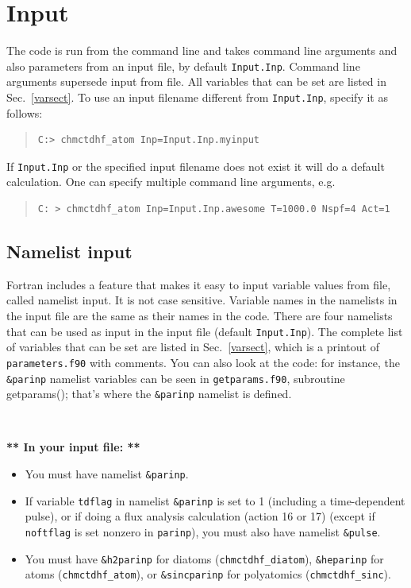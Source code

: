 \documentclass[10pt,leqno, oneside]{book}
\begin{document}
\chapter{Input}

 The code is run from the command line and takes command line arguments and also parameters from an input file, by default \verb#Input.Inp#.  
 Command line arguments supersede input from file.
 All variables that can be set are listed in Sec.~\ref{varsect}.
To use an input filename different from \verb#Input.Inp#, specify it as follows:
\begin{quote}
{\small\begin{verbatim}
C:> chmctdhf_atom Inp=Input.Inp.myinput
\end{verbatim}}
\end{quote}
%
If \verb#Input.Inp# or the specified input filename does not exist it will do a default calculation.  One can specify multiple command 
line arguments, e.g.
\begin{quote}
{\small 
\begin{verbatim}
C: > chmctdhf_atom Inp=Input.Inp.awesome T=1000.0 Nspf=4 Act=1
\end{verbatim}}
\end{quote}



\section{Namelist input}

Fortran includes a feature that makes it easy to input variable values from file, called namelist input.  It is not case sensitive.  
Variable names in the namelists in the input file are the same as their names in the code.  There are four 
namelists that can be used as input in the input file (default \verb#Input.Inp#).   The complete list of variables that can be set are listed in Sec.~\ref{varsect},
which is a printout of \verb#parameters.f90# with comments.  You can also look at the code: for instance,
the \verb#&parinp# namelist variables can be seen in \verb#getparams.f90#, subroutine getparams(); that's where the \verb#&parinp# namelist is defined.

\

{\large \textbf{** In your input file: **}}
\begin{itemize}
\item{You must have namelist \verb#&parinp#.}
\item{If variable \verb#tdflag# in namelist \verb#&parinp# is set to 1 (including a time-dependent pulse), or if doing a flux analysis calculation
(action 16 or 17) (except if \verb#noftflag# is set nonzero in \verb#parinp#), you must also have namelist \verb#&pulse#.}
\item{You must have \verb#&h2parinp# for diatoms (\verb#chmctdhf_diatom#), \verb#&heparinp# for atoms (\verb#chmctdhf_atom#), or 
\verb#&sincparinp# for polyatomics (\verb#chmctdhf_sinc#).}
\end{itemize}
\end{document}
